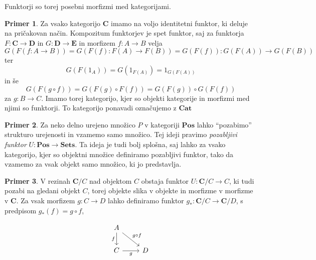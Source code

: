 \documentclass[12pt,a4paper]{book}
\theoremstyle{definition}
\theoremstyle{plain}
\theoremstyle{definition}
\newtheorem{primer}{Primer}[section]
\theoremstyle{remark}
\newcommand{\cat}[1]{\textbf{#1}}
\begin{document}
Funktorji so torej posebni morfizmi med kategorijami.

\begin{primer}
Za vsako kategorijo $\cat{C}$ imamo na voljo identitetni funktor, ki deluje na pričakovan način. Kompozitum funktorjev je spet funktor, saj za funktorja $F : \cat{C} \to \cat{D}$ in $G : \cat{D} \to \cat{E}$ in morfizem $f : A \to B$ velja
$$G(F(f : A \to B)) = G(F(f) : F(A) \to F(B)) = G(F(f)) : G(F(A)) \to G(F(B))$$
ter
$$G(F(1_A)) = G(1_{F(A)}) = 1_{G(F(A))}$$
in še
$$G(F(g \circ f)) = G(F(g) \circ F(f)) = G(F(g)) \circ G(F(f))$$
za $g : B \to C$. Imamo torej kategorijo, kjer so objekti kategorije in morfizmi med njimi so funktorji. To kategorijo ponavadi označujemo z $\cat{Cat}$ 
\end{primer}

\begin{primer}
Za neko delno urejeno množico $P$ v kategoriji $\cat{Pos}$ lahko "`pozabimo"' strukturo urejenosti in vzamemo samo množico. Tej ideji pravimo \emph{pozabljivi funktor} $U : \cat{Pos} \to \cat{Sets}$. Ta ideja je tudi bolj splošna, saj lahko za vsako kategorijo, kjer so objektni množice definiramo pozabljivi funktor, tako da vzamemo za vsak objekt samo množico, ki jo predstavlja.
\end{primer}

\begin{primer}
V rezinah $\cat{C}/C$ nad objektom $C$ obstaja funktor $U : \cat{C}/C \to C$, ki tudi pozabi na gledani objekt $C$, torej objekte slika v objekte in morfizme v morfizme v $\cat{C}$. Za vsak morfizem $g : C \to D$ lahko definiramo funktor $g_* : \cat{C}/C \to \cat{C}/D$, s predpisom $g_*(f) = g \circ f$,

$$\begin{tikzcd}
A \ar[d, "f"'] \ar[dr, "g \circ f"] & \\
C \ar[r, "g"'] & D \\
\end{tikzcd}$$

\end{primer}
\end{document}

